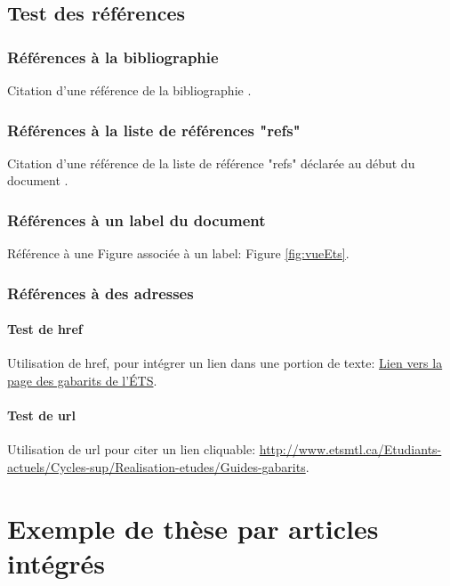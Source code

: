 \documentclass[letterpaper%
, twoside%
, 12pt%
,these%
,francais
,creativecommons,hyperref%
]{thETS}
\begin{document}
\section{Test des références}

\subsection{Références à la bibliographie}

Citation d'une référence de la bibliographie \cite{Arica2002}.

\subsection{Références à la liste de références "refs"}

Citation d'une référence de la liste de référence "refs" déclarée au début du document .

\subsection{Références à un label du document}

Référence à une Figure associée à un label: Figure \ref{fig:vueEts}.

\subsection{Références à des adresses}

\subsubsection{Test de href}

Utilisation de href, pour intégrer un lien dans une portion de texte:
\href{http://www.etsmtl.ca/Etudiants-actuels/Cycles-sup/Realisation-etudes/Guides-gabarits}{Lien vers la page des gabarits de l'ÉTS}.

\subsubsection{Test de url}

Utilisation de url pour citer un lien cliquable:
\url{http://www.etsmtl.ca/Etudiants-actuels/Cycles-sup/Realisation-etudes/Guides-gabarits}.

\chapter{Exemple de thèse par articles intégrés}
\end{document}
